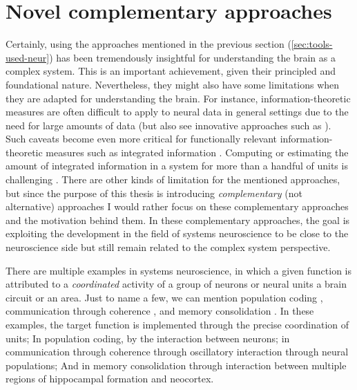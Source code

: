 \section{Novel complementary approaches}\label{sec:toward-neur-insp}

Certainly, using the approaches mentioned in the previous section (\autoref{sec:tools-used-neur})
has been tremendously insightful for understanding the brain as a complex system.
This is an important achievement, given their principled and foundational nature.
Nevertheless, they might also have some limitations when they are adapted for understanding the brain.
For instance,  information-theoretic measures are often difficult to apply to neural data in general settings due to the need for large amounts of data
(but also see innovative approaches such as \cite{zbiliQuickEasyWay2020}).
Such caveats become even more critical for functionally relevant information-theoretic measures such as integrated information \cite{oizumiPhenomenologyMechanismsConsciousness2014}.
Computing or estimating the amount of integrated information in a system for more than a handful of units is challenging \cite{tononiIntegratedInformationTheory2016}.
There are other kinds of limitation for the mentioned approaches,
but since the purpose of this thesis is introducing \emph{complementary} (not alternative) approaches 
I would rather focus on these complementary approaches and the motivation behind them.
In these complementary approaches, the goal is exploiting the development in the field of systems neuroscience to be close to the neuroscience side but still
remain related to the complex system perspective.


There are multiple examples in systems neuroscience,
in which a given function is attributed to a \emph{coordinated} activity of a group of neurons or neural units 
\eg a brain circuit or an area.
Just to name a few, we can mention population coding \cite{sangerNeuralPopulationCodes2003,shamirEmergingPrinciplesPopulation2014}, communication through coherence \cite{friesMechanismCognitiveDynamics2005,friesRhythmsCognitionCommunication2015},
and memory consolidation \cite[Chapter 7]{malsburgMalsburgDynamicCoordination2010}.
In these examples, the target function is implemented through the precise coordination of units;
In population coding, by the interaction between neurons; 
in communication through coherence through oscillatory interaction through neural populations; 
And in memory consolidation through interaction between multiple regions of hippocampal formation and neocortex.

